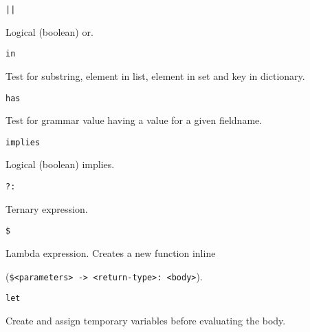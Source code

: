 {\begin{itemize}
{		\item[] \texttt{||}
		
			Logical (boolean) or.
			
		\item[] \texttt{in}
			
			Test for substring, element in list, element in set and key in
			dictionary.
			
		\item[] \texttt{has}
		
			Test for grammar value having a value for a given fieldname.
			
		\item[] \texttt{implies}
		
			Logical (boolean) implies.
			
		\item[] \texttt{?:}
		
			Ternary expression.
			
		\item[] \texttt{\$}
		
			Lambda expression. Creates a new function inline
			
			(\texttt{\$<parameters> -> <return-type>: <body>}).
			
		\item[] \texttt{let}
		
			Create and assign temporary variables before evaluating the body.
	}
	\end{itemize}
}
















